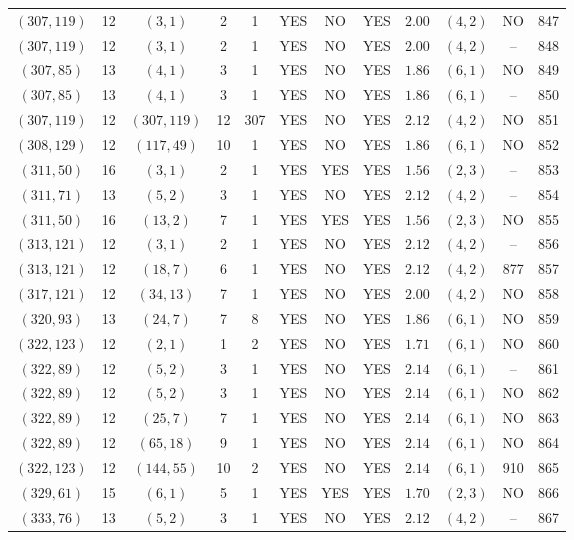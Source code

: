 \begin{longtable}{|c|c|c|c|c|c|c|c|c|c|c|c|}
$(307,119)$ & 12 & $(3,1)$ & 2 & 1 & YES & NO & YES & $2.00$ & $(4,2)$ & NO & 847\\
$(307,119)$ & 12 & $(3,1)$ & 2 & 1 & YES & NO & YES & $2.00$ & $(4,2)$ & -- & 848\\
$(307,85)$ & 13 & $(4,1)$ & 3 & 1 & YES & NO & YES & $1.86$ & $(6,1)$ & NO & 849\\
$(307,85)$ & 13 & $(4,1)$ & 3 & 1 & YES & NO & YES & $1.86$ & $(6,1)$ & -- & 850\\
$(307,119)$ & 12 & $(307,119)$ & 12 & 307 & YES & NO & YES & $2.12$ & $(4,2)$ & NO & 851\\
$(308,129)$ & 12 & $(117,49)$ & 10 & 1 & YES & NO & YES & $1.86$ & $(6,1)$ & NO & 852\\
$(311,50)$ & 16 & $(3,1)$ & 2 & 1 & YES & YES & YES & $1.56$ & $(2,3)$ & -- & 853\\
$(311,71)$ & 13 & $(5,2)$ & 3 & 1 & YES & NO & YES & $2.12$ & $(4,2)$ & -- & 854\\
$(311,50)$ & 16 & $(13,2)$ & 7 & 1 & YES & YES & YES & $1.56$ & $(2,3)$ & NO & 855\\
$(313,121)$ & 12 & $(3,1)$ & 2 & 1 & YES & NO & YES & $2.12$ & $(4,2)$ & -- & 856\\
$(313,121)$ & 12 & $(18,7)$ & 6 & 1 & YES & NO & YES & $2.12$ & $(4,2)$ & 877 & 857\\
$(317,121)$ & 12 & $(34,13)$ & 7 & 1 & YES & NO & YES & $2.00$ & $(4,2)$ & NO & 858\\
$(320,93)$ & 13 & $(24,7)$ & 7 & 8 & YES & NO & YES & $1.86$ & $(6,1)$ & NO & 859\\
$(322,123)$ & 12 & $(2,1)$ & 1 & 2 & YES & NO & YES & $1.71$ & $(6,1)$ & NO & 860\\
$(322,89)$ & 12 & $(5,2)$ & 3 & 1 & YES & NO & YES & $2.14$ & $(6,1)$ & -- & 861\\
$(322,89)$ & 12 & $(5,2)$ & 3 & 1 & YES & NO & YES & $2.14$ & $(6,1)$ & NO & 862\\
$(322,89)$ & 12 & $(25,7)$ & 7 & 1 & YES & NO & YES & $2.14$ & $(6,1)$ & NO & 863\\
$(322,89)$ & 12 & $(65,18)$ & 9 & 1 & YES & NO & YES & $2.14$ & $(6,1)$ & NO & 864\\
$(322,123)$ & 12 & $(144,55)$ & 10 & 2 & YES & NO & YES & $2.14$ & $(6,1)$ & 910 & 865\\
$(329,61)$ & 15 & $(6,1)$ & 5 & 1 & YES & YES & YES & $1.70$ & $(2,3)$ & NO & 866\\
$(333,76)$ & 13 & $(5,2)$ & 3 & 1 & YES & NO & YES & $2.12$ & $(4,2)$ & -- & 867\\

\end{longtable}
